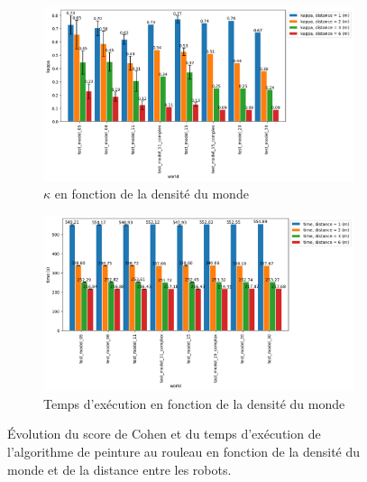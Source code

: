 \documentclass[francais,RandD]{rapportPFE}
\begin{document}
			\begin{figure}[h!]
				\centering
				\begin{subfigure}[t]{0.9\linewidth}
					\includegraphics[width=\linewidth]{graphics/peinture_au_rouleau-kappa_vs_world_for_each_d.png}
					\caption{$\kappa$ en fonction de la densité du monde}
					\label{fig:peinture_au_rouleau-kappa_vs_world}
				\end{subfigure}
				\hfill
				\begin{subfigure}[t]{0.9\linewidth}
						\includegraphics[width=\linewidth]{graphics/peinture_au_rouleau-time_vs_world_for_each_d.png}
						\caption{Temps d'exécution en fonction de la densité du monde}
						\label{fig:peinture_au_rouleau-time_vs_world}
				\end{subfigure}
				\caption{Évolution du score de Cohen et du temps d'exécution de l'algorithme de peinture au rouleau en fonction de la densité du monde et de la distance entre les robots.}
				\label{fig:peinture_au_rouleau-world}
			\end{figure}
\end{document}

